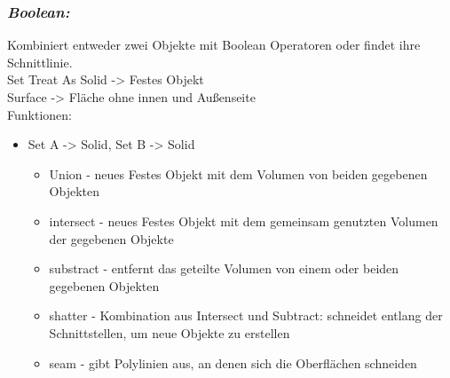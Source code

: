 \documentclass[paper=a4,fontsize=12pt,ngerman]{scrartcl}
\begin{document}
	\subsubsection*{\textit{Boolean:}}
	Kombiniert entweder zwei Objekte mit Boolean Operatoren oder findet ihre Schnittlinie.\\
	
	Set	Treat As Solid -> Festes Objekt\\
	Surface -> Fläche ohne innen und Außenseite\\
	Funktionen:
	\begin{itemize}
		\item Set A -> Solid, Set B -> Solid
		\begin{itemize}
			\item Union - neues Festes Objekt mit dem Volumen von beiden gegebenen Objekten
			\item intersect - neues Festes Objekt mit dem gemeinsam genutzten Volumen der gegebenen Objekte
			\item substract - entfernt das geteilte Volumen von einem oder beiden gegebenen Objekten
			\item shatter - Kombination aus Intersect und Subtract: schneidet entlang der Schnittstellen, um neue Objekte zu erstellen
			\item seam - gibt Polylinien aus, an denen sich die Oberflächen schneiden
		\end{itemize}
		

\end{itemize}
\end{document}
